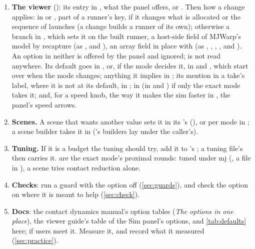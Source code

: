 \begin{enumerate}
\item \textbf{The viewer} (): its entry in , what the panel offers,  or . Then how a change applies: in  or , part of a runner's key, if it changes what is allocated or the sequence of launches (a change builds a runner of its own); otherwise a branch in , which sets it on the built runner, a host-side field of MJWarp's model by recapture (as ,  and ), an array field in place with  (as , , , ,  and ). An option in neither is offered by the panel and ignored;  is not read anywhere. Its default goes in , or, if the mode decides it, in  and , which start over when the mode changes; anything it implies in ; its mention in a take's label, where it is not at its default, in ; in  (in  and ) if only the exact mode takes it; and, for a speed knob, the way it makes the sim faster in , the panel's speed arrows.
\item \textbf{Scenes.} A scene that wants another value sets it in its 's  (), or per mode in ; a scene builder takes it in  ('s builders lay  under the caller's).
\item \textbf{Tuning.} If it is a budget the tuning should try, add it to 's ; a tuning file's  then carries it.  are the exact mode's proximal rounds: tuned under mj (, a file in ), a scene tries contact reduction alone.
\item \textbf{Checks}: run a guard with the option off (\cref{sec:guards}), and check the option on where it is meant to help (\cref{sec:check}).
\item \textbf{Docs}: the contact dynamics manual's option tables (\emph{The options in one place}), the viewer guide's table of the Sim panel's options, and \cref{tab:defaults} here;  if users meet it. Measure it, and record what it measured (\cref{sec:practice}).
\end{enumerate}

